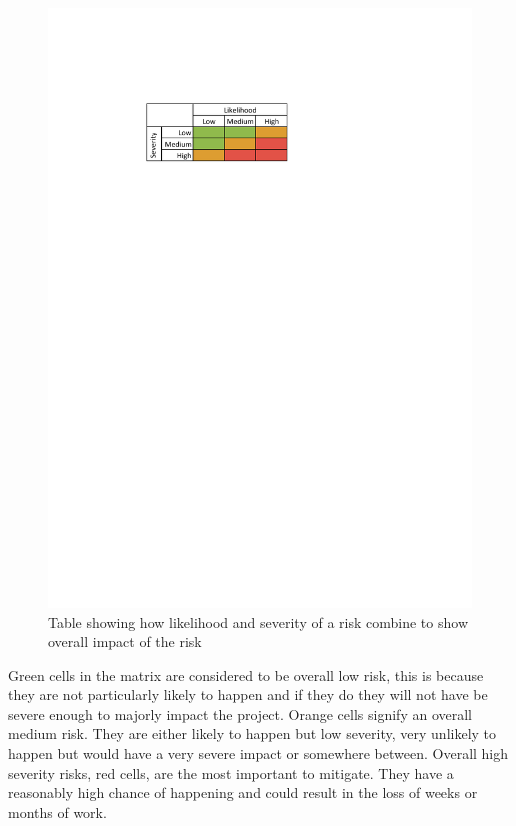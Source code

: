 \documentclass{report}   	%
\begin{document}
\begin{figure}[h]
	\begin{centering}
		\includegraphics{risktable.pdf}
		\caption{Table showing how likelihood and severity of a risk combine to show overall impact of the risk}
		\label{fig:risktable}
	\end{centering}
\end{figure}

Green cells in the matrix are considered to be overall low risk, this is because they are not particularly likely to happen and if they do they will not have be severe enough to majorly impact the project.
Orange cells signify an overall medium risk.
They are either likely to happen but low severity, very unlikely to happen but would have a very severe impact or somewhere between.
Overall high severity risks, red cells, are the most important to mitigate.
They have a reasonably high chance of happening and could result in the loss of weeks or months of work.
\end{document}

